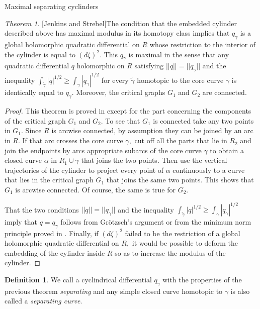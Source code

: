 \documentclass[12pt]{amsart}
\theoremstyle{remark}
\newtheorem{theorem}{Theorem}
\theoremstyle{definition}
\newtheorem{definition}{Definition}
\theoremstyle{definition}
\begin{document}
\begin{section}{Maximal separating cyclinders}
  
\begin{theorem}{[Jenkins and Strebel]}\label{thm6} The condition that the embedded cylinder described above has maximal modulus in its homotopy class implies  that $q_{\gamma}$  is a global holomorphic quadratic differential on $R$ whose restriction to the interior of the cylinder is equal to $(d\zeta)^2.$  This $q_{\gamma}$ is maximal in the sense that any  quadratic differential $q$ holomorphic on $R$ satisfying $||q||=||q_{\gamma}||$ and the inequality 
$\int_{\tilde{\gamma} } |q|^{1/2} \geq \int_{\gamma} |q_{\gamma}|^{1/2}$ 
for every $\tilde{\gamma}$ homotopic to the core curve $\gamma$
is identically equal to $q_{\gamma}.$ Moreover, the critical graphs $G_1$ and $G_2$ are connected.
\end{theorem}
\begin{proof} This theorem is proved in \cite{Strebelbook} except for the part concerning the components of the critical graph $G_1$ and $G_2.$
To see that $G_1$ is connected take any two points in $G_1.$  Since $R$ is arcwise connected, by assumption they can be joined by an arc in $R.$ If that arc crosses the core curve $\gamma,$ cut off all the parts that lie in $R_2$ and join the endpoints by arcs appropriate subarcs of  the core curve $\gamma$ to obtain a closed curve $\alpha$ in $R_1 \cup \gamma$ that joins the two points.  Then use the vertical trajectories of the cylinder to project every point of $\alpha$ continuously to a curve that lies in the critical graph $G_1$ that joins the same two points.  This shows that $G_1$ is arcwise connected. Of course, the same is true for $G_2.$

That the two conditions $||q||=||q_{\gamma}||$ and the inequality 
$\int_{\tilde{\gamma} } |q|^{1/2} \geq \int_{\gamma} |q_{\gamma}|^{1/2}$ imply that $q=q_{\gamma}$ follows from Gr\"otzsch's argument or from the minimum norm principle proved in \cite{Gardinerbook}. Finally, if 
$(d\zeta)^2$ failed to be the restriction of a global holomorphic quadratic differential on $R,$ it would be possible to deform the embedding of the cylinder inside $R$ so as to increase the modulus of the cylinder. 
\end{proof}

\begin{definition} We call a cyclindrical differential $q_{\gamma}$ with the properties of the previous theorem {\it separating} and any simple closed curve homotopic to $\gamma$ is also called a  {\it separating curve}.
\end{definition}
  
 \end{section}
 
\end{document}
